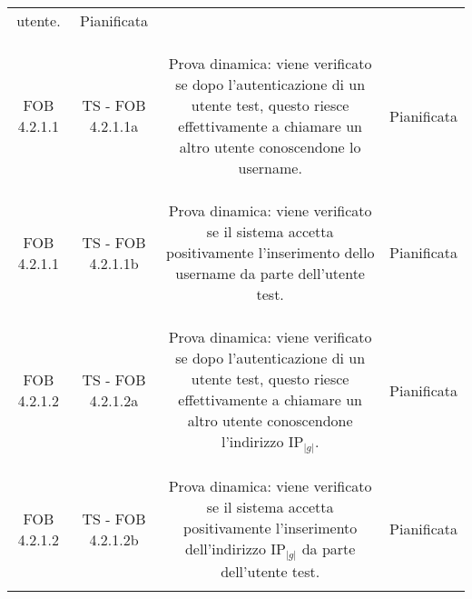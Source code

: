 {{\begin{table}[h!]
\begin{center}
\begin{minipage}{1\linewidth}
\begin{tabular}{c c c c}
\begin{minipage}{0.55\linewidth}
							utente.
						\end{minipage}	
						&
						Pianificata
						\\
						\\
						\bottomrule
						\\\\
						FOB 4.2.1.1
						&
						TS - FOB 4.2.1.1a 			
						& 
						\begin{minipage}{0.55\linewidth}
							Prova dinamica: viene verificato se dopo l'autenticazione di un
							utente test, questo riesce effettivamente a chiamare un altro
							utente conoscendone lo username.
						\end{minipage}	
						&
						Pianificata
						\\
						\\
						\bottomrule
						\\\\
						FOB 4.2.1.1
						&
						TS - FOB 4.2.1.1b 			
						& 
						\begin{minipage}{0.55\linewidth}
							Prova dinamica: viene verificato se il sistema accetta
							positivamente l'inserimento dello username da parte dell'utente
							test.
						\end{minipage}	
						&
						Pianificata
						\\
						\\
						\bottomrule
						\\\\
						FOB 4.2.1.2
						&
						TS - FOB 4.2.1.2a 			
						& 
						\begin{minipage}{0.55\linewidth}
							Prova dinamica: viene verificato se dopo l'autenticazione di un
							utente test, questo riesce effettivamente a chiamare un altro
							utente conoscendone l'indirizzo IP$_{|g|}$.
						\end{minipage}	
						&
						Pianificata
						\\
						\\
						\bottomrule
						\\\\
						FOB 4.2.1.2
						&
						TS - FOB 4.2.1.2b 			
						& 
						\begin{minipage}{0.55\linewidth}
							Prova dinamica:  viene verificato se il sistema accetta
							positivamente l'inserimento dell'indirizzo IP$_{|g|}$ da parte
							dell'utente test.
						\end{minipage}	
						&
						Pianificata
						\\
						\\

\end{tabular}
\end{minipage}
\end{center}
\end{table}}}
